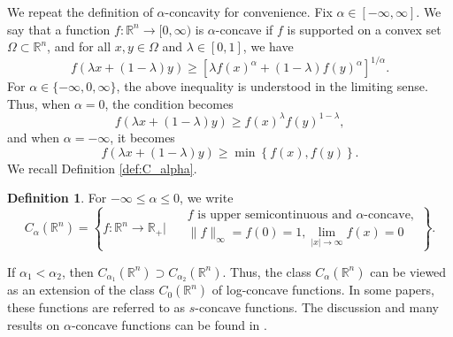 \documentclass[11pt]{amsart}
\theoremstyle{plain}
\theoremstyle{definition}
\newtheorem{defn}[theorem]{Definition}
\theoremstyle{remark}
\begin{document}
We repeat the definition of $\alpha$-concavity for convenience.
Fix \( \alpha \in [-\infty, \infty] \). We say that a function \( f : \mathbb{R}^n \rightarrow [0, \infty ) \) is \( \alpha \)-concave if \( f \) is supported on a convex set \( \Omega \subset \mathbb{R}^n \), and for all \( x, y \in \Omega \) and \( \lambda \in [0,1] \), we have
\begin{equation} \label{alp-conc}
    f(\lambda x + (1 - \lambda)y)
    \geq \left[\lambda f(x)^\alpha + (1 - \lambda)f(y)^\alpha\right]^{1/\alpha}.
\end{equation}
For $ \alpha\in\{-\infty, 0, \infty\}$, the above inequality is understood in the limiting sense. Thus, when $\alpha = 0$, the condition becomes
\begin{equation}
    f(\lambda x + (1 - \lambda)y)
    \geq f(x)^\lambda f(y)^{1 - \lambda},
\end{equation}
and when $\alpha = -\infty$, it becomes
\begin{equation}
    f(\lambda x + (1 - \lambda)y)
    \geq \min \left\{ f(x) ,  f(y) \right\}.
\end{equation}
We recall Definition \ref{def:C_alpha}.
\begin{defn}
For $-\infty \leq \alpha \leq 0$, we write
\begin{equation*}
C_\alpha(\mathbb{R}^n)=
\left\{f: \mathbb{R}^n\to \mathbb{R}_+  \Bigg|\begin{aligned}
\,\,\, & f \text{ is upper semicontinuous and $\alpha$-concave}  , \\
&\|f\|_{\infty}=f(0)=1, \lim_{|x| \to \infty}  f(x) = 0
\end{aligned}\right\}.
\end{equation*}
\end{defn}
If \( \alpha_1 < \alpha_2 \), then \( C_{\alpha_1}(\mathbb{R}^n) \supset C_{\alpha_2}(\mathbb{R}^n) \). Thus, the class \( C_\alpha(\mathbb{R}^n) \) can be viewed as an extension of the class \( C_0(\mathbb{R}^n) \) of log-concave functions.
In some papers, these functions are referred to as  $s$-concave functions. The discussion and many results on $ \alpha$-concave functions can be found in \cite{R-13,MR-12, MR-13,B-10,R-14}.
\end{document}
